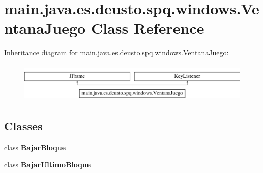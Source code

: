 \hypertarget{classmain_1_1java_1_1es_1_1deusto_1_1spq_1_1windows_1_1_ventana_juego}{}\section{main.\+java.\+es.\+deusto.\+spq.\+windows.\+Ventana\+Juego Class Reference}
\label{classmain_1_1java_1_1es_1_1deusto_1_1spq_1_1windows_1_1_ventana_juego}
Inheritance diagram for main.\+java.\+es.\+deusto.\+spq.\+windows.\+Ventana\+Juego\+:\begin{figure}[H]
\begin{center}
\leavevmode
\includegraphics[height=1.911263cm]{classmain_1_1java_1_1es_1_1deusto_1_1spq_1_1windows_1_1_ventana_juego}
\end{center}
\end{figure}
\subsection*{Classes}
\begin{DoxyCompactItemize}
\item 
class {\bfseries Bajar\+Bloque}
\item 
class {\bfseries Bajar\+Ultimo\+Bloque}
\end{DoxyCompactItemize}
